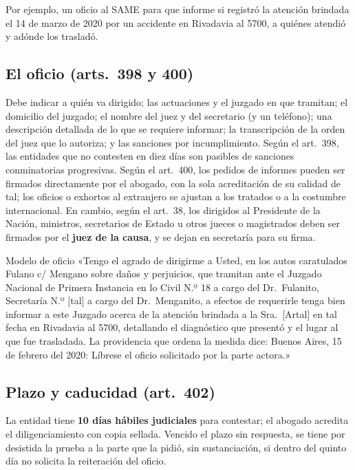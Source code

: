 \documentclass[12pt,oneside]{book}
\begin{document}
Por ejemplo, un oficio al SAME para que informe si registró la atención brindada el 14 de marzo de 2020 por un accidente en Rivadavia al 5700, a quiénes atendió y adónde los trasladó.

\subsection{El oficio (arts.~398 y 400)}

Debe indicar a quién va dirigido; las actuaciones y el juzgado en que tramitan; el domicilio del juzgado; el nombre del juez y del secretario (y un teléfono); una descripción detallada de lo que se requiere informar; la transcripción de la orden del juez que lo autoriza; y las sanciones por incumplimiento. Según el art.~398, las entidades que no contesten en diez días son pasibles de sanciones conminatorias progresivas. Según el art.~400, los pedidos de informes pueden ser firmados directamente por el abogado, con la sola acreditación de su calidad de tal; los oficios o exhortos al extranjero se ajustan a los tratados o a la costumbre internacional. En cambio, según el art.~38, los dirigidos al Presidente de la Nación, ministros, secretarios de Estado u otros jueces o magistrados deben ser firmados por el \textbf{juez de la causa}, y se dejan en secretaría para su firma.

\begin{ejemplo}{Modelo de oficio}
«Tengo el agrado de dirigirme a Usted, en los autos caratulados Fulano c/ Mengano sobre daños y perjuicios, que tramitan ante el Juzgado Nacional de Primera Instancia en lo Civil N.º 18 a cargo del Dr.\ Fulanito, Secretaría N.º [tal] a cargo del Dr.\ Menganito, a efectos de requerirle tenga bien informar a este Juzgado acerca de la atención brindada a la Sra.\ [Artal] en tal fecha en Rivadavia al 5700, detallando el diagnóstico que presentó y el lugar al que fue trasladada. La providencia que ordena la medida dice: Buenos Aires, 15 de febrero del 2020: Líbrese el oficio solicitado por la parte actora.»
\end{ejemplo}

\subsection{Plazo y caducidad (art.~402)}

La entidad tiene \textbf{10 días hábiles judiciales} para contestar; el abogado acredita el diligenciamiento con copia sellada. %
Vencido el plazo sin respuesta, se tiene por desistida la prueba a la parte que la pidió, sin sustanciación, si dentro del quinto día no solicita la reiteración del oficio.
\end{document}
